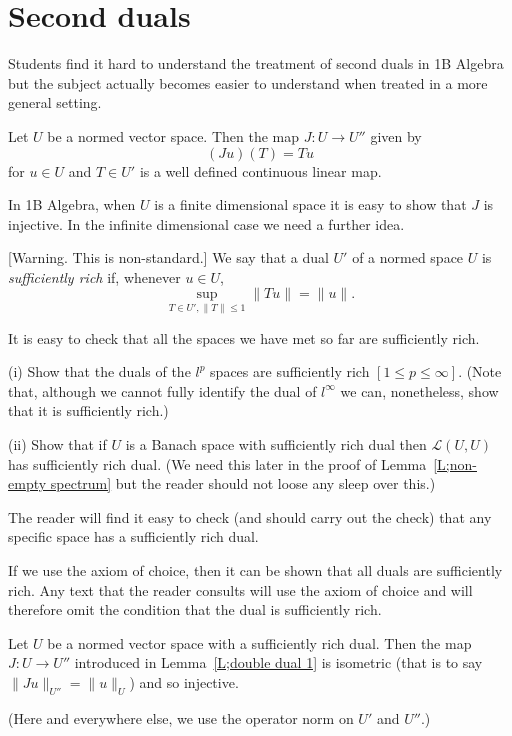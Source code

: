 \section{Second duals} Students find it hard to understand
the treatment of second duals in 1B Algebra but the
subject actually becomes easier to understand when treated
in a more general setting.
\begin{lemma}\label{L;double dual 1} Let $U$ be a normed vector space.
Then the map $J:U\rightarrow U''$ given by
\[(Ju)(T)=Tu\]
for $u\in U$ and $T\in U'$ is a well
defined continuous linear map.
\end{lemma}
In 1B Algebra, when $U$ is a finite dimensional space
it is easy to show that $J$ is injective.
In the infinite dimensional case we need a further idea.
\begin{definition}\label{D;sufficiently rich} 
[Warning. This is non-standard.]
We say that a dual $U'$ of a normed space $U$ is
\emph{sufficiently rich} if, whenever $u\in U$, 
\[\sup_{T\in U',\|T\|\leq 1}\|Tu\|=\|u\|.\]
\end{definition}
It is easy to check that all the spaces we have met
so far are sufficiently rich.
\begin{exercise} (i) Show that the duals of the $l^{p}$
spaces are sufficiently rich $[1\leq p\leq \infty]$.
(Note that, although we cannot fully identify the
dual of $l^{\infty}$ we can, nonetheless, show that
it is sufficiently rich.)

(ii) Show that if $U$ is a Banach space with sufficiently
rich dual then ${\mathcal L}(U,U)$ has sufficiently rich dual.
(We need this later in the proof of Lemma~\ref{L;non-empty spectrum}
but the reader should not loose any sleep over this.)
\end{exercise}
The reader will find it easy to check
(and should carry out the check) that any
specific space has a sufficiently rich dual.

If we use the axiom of choice, then it can be shown
that all duals are sufficiently rich. Any text that the
reader consults will use the  axiom of choice
and will therefore omit the condition that
the dual is sufficiently rich.  
\begin{lemma} Let $U$ be a normed vector space
with a sufficiently rich dual.
Then the map $J:U\rightarrow U''$ introduced
in Lemma~\ref{L;double dual 1} is isometric
(that is to say $\|Ju\|_{U''}=\|u\|_{U}$)
and so injective.
\end{lemma}
(Here and everywhere else, we use the operator norm on
$U'$ and $U''$.)

